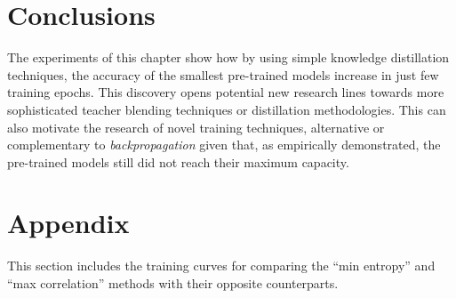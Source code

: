  \section{Conclusions}  \label{sec:distillation_conclusions}
The experiments of this chapter show how by using simple knowledge distillation techniques, the accuracy of the smallest pre-trained models increase in just few training epochs. This discovery opens potential new research lines towards more sophisticated teacher blending techniques or distillation methodologies. This can also motivate the research of novel training techniques, alternative or complementary to \textit{backpropagation} given that, as empirically demonstrated, the pre-trained models still did not reach their maximum capacity.


 
 \section{Appendix}
 This section includes the training curves for comparing the ``min entropy'' and ``max correlation'' methods with their opposite counterparts.
